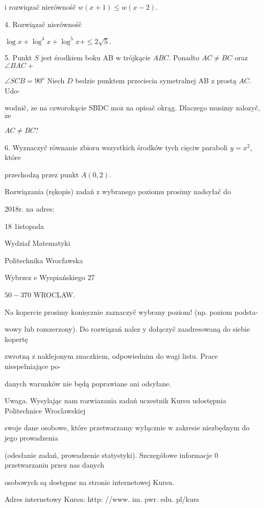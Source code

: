 \documentclass[a4paper,12pt]{article}
\begin{document}
$\mathrm{i}$ rozwiqzač nierównośč $w(x+1)\leq w(x-2).$

4. Rozwiązač nierównośč

$\log x+\log^{3}x+\log^{5}x+\leq 2\sqrt{5}.$

5. Punkt $S$ jest środkiem boku AB $\mathrm{w}$ trójkącie $ABC$. Ponadto $AC\neq BC$ oraz $\angle BAC+$

$\angle SCB=90^{\mathrm{o}}$ Niech $D$ bedzie punktem przeciecia symetralnej AB $\mathrm{z}$ prostą $AC$. Udo-

wodnič, $\dot{\mathrm{z}}\mathrm{e}$ na czworokącie SBDC $\mathrm{m}\mathrm{o}\dot{\mathrm{z}}$ na opisač okrąg. Dlaczego musimy zalozyč, $\dot{\mathrm{z}}\mathrm{e}$

$AC\neq BC$?

6. Wyznaczyč równanie zbioru wszystkich środków tych cięciw paraboli $y = x^{2}$, które

przechodzą przez punkt $A(0,2).$

Rozwiązania (rękopis) zadań z wybranego poziomu prosimy nadsyłač do

2018r. na adres:

18 1istopada

Wydziaf Matematyki

Politechnika Wrocfawska

Wybrzez $\mathrm{e}$ Wyspiańskiego 27

$50-370$ WROCLAW.

Na kopercie prosimy $\underline{\mathrm{k}\mathrm{o}\mathrm{n}\mathrm{i}\mathrm{e}\mathrm{c}\mathrm{z}\mathrm{n}\mathrm{i}\mathrm{e}}$ zaznaczyč wybrany poziom! (np. poziom podsta-

wowy lub rozszerzony). Do rozwiązań nalez $\mathrm{y}$ dołączyč zaadresowaną do siebie kopertę

zwrotną $\mathrm{z}$ naklejonym znaczkiem, odpowiednim do wagi listu. Prace niespełniające po-

danych warunków nie będą poprawiane ani odsyłane.

Uwaga. Wysylając nam rozwiazania zadań uczestnik Kursu udostępnia Politechnice Wroclawskiej

swoje dane osobowe, które przetwarzamy wyłącznie $\mathrm{w}$ zakresie niezbędnym do jego prowadzenia

(odesłanie zadań, prowadzenie statystyki). Szczegółowe informacje $0$ przetwarzaniu przez nas danych

osobowych są dostępne na stronie internetowej Kursu.

Adres internetowy Kursu: http: //www. im. pwr. edu. pl/kurs
\end{document}
